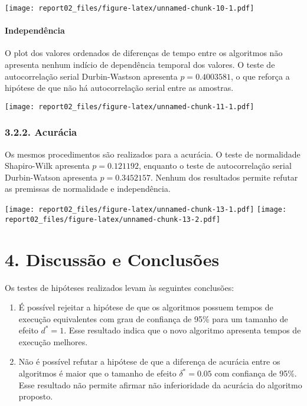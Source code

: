 \documentclass[]{article}
\providecommand{\tightlist}{%
  \setlength{\itemsep}{0pt}\setlength{\parskip}{0pt}}
\let\oldparagraph\paragraph
\renewcommand{\paragraph}[1]{\oldparagraph{#1}\mbox{}}
\begin{document}
\texttt{[image: report02\_files/figure-latex/unnamed-chunk-10-1.pdf]}

\paragraph{Independência}\label{independencia}

O plot dos valores ordenados de diferenças de tempo entre os algoritmos
não apresenta nenhum indício de dependência temporal dos valores. O
teste de autocorrelação serial Durbin-Wastson apresenta
\(p = 0.4003581\), o que reforça a hipótese de que não há autocorrelação
serial entre as amostras.

\texttt{[image: report02\_files/figure-latex/unnamed-chunk-11-1.pdf]}

\subsubsection{3.2.2. Acurácia}\label{acuracia}

Os mesmos procedimentos são realizados para a acurácia. O teste de
normalidade Shapiro-Wilk apresenta \(p = 0.121192\), enquanto o teste de
autocorrelação serial Durbin-Watson apresenta \(p = 0.3452157\). Nenhum
dos resultados permite refutar as premissas de normalidade e
independência.

\texttt{[image: report02\_files/figure-latex/unnamed-chunk-13-1.pdf]}
\texttt{[image: report02\_files/figure-latex/unnamed-chunk-13-2.pdf]}

\section{4. Discussão e Conclusões}\label{discussao-e-conclusoes}

Os testes de hipóteses realizados levam às seguintes conclusões:

\begin{enumerate}
\def\labelenumi{\arabic{enumi}.}
\tightlist
\item
  É possível rejeitar a hipótese de que os algoritmos possuem tempos de
  execução equivalentes com grau de confiança de 95\% para um tamanho de
  efeito \(d^* = 1\). Esse resultado indica que o novo algoritmo
  apresenta tempos de execução melhores.
\item
  Não é possível refutar a hipótese de que a diferença de acurácia entre
  os algoritmos é maior que o tamanho de efeito \(\delta^* = 0.05\) com
  confiança de 95\%. Esse resultado não permite afirmar não
  inferioridade da acurácia do algoritmo proposto.
\end{enumerate}
\end{document}
